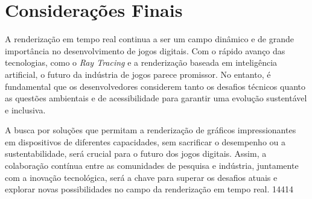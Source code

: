 \section{Considerações Finais}
A renderização em tempo real continua a ser um campo dinâmico e de grande importância no desenvolvimento de jogos digitais. Com o rápido avanço das tecnologias, como o \textit{Ray Tracing} e a renderização baseada em inteligência artificial, o futuro da indústria de jogos parece promissor. No entanto, é fundamental que os desenvolvedores considerem tanto os desafios técnicos quanto as questões ambientais e de acessibilidade para garantir uma evolução sustentável e inclusiva.

A busca por soluções que permitam a renderização de gráficos impressionantes em dispositivos de diferentes capacidades, sem sacrificar o desempenho ou a sustentabilidade, será crucial para o futuro dos jogos digitais. Assim, a colaboração contínua entre as comunidades de pesquisa e indústria, juntamente com a inovação tecnológica, será a chave para superar os desafios atuais e explorar novas possibilidades no campo da renderização em tempo real.
14414